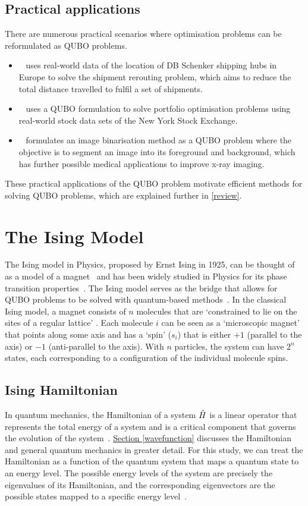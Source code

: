 \subsection{Practical applications}
There are numerous practical scenarios where optimisation problems can be reformulated as QUBO problems. 
\begin{itemize}
    \item~\cite{b7} uses real-world data of the location of DB Schenker shipping hubs in Europe to solve the shipment rerouting problem, which aims to reduce the total distance travelled to fulfil a set of shipments.
    \item~\cite{b8} uses a QUBO formulation to solve portfolio optimisation problems using real-world stock data sets of the New York Stock Exchange.
    \item~\cite{b9} formulates an image binarisation method as a QUBO problem where the objective is to segment an image into its foreground and background, which has further possible medical applications to improve x-ray imaging.
\end{itemize}
These practical applications of the QUBO problem motivate efficient methods for solving QUBO problems, which are explained further in \autoref{review}.

\section{The Ising Model}
The Ising model in Physics, proposed by Ernst Ising in 1925, can be thought of as a model of a magnet~\cite{isingising} and has been widely studied in Physics for its phase transition properties~\cite{cipra1987introduction}. The Ising model serves as the bridge that allows for QUBO problems to be solved with quantum-based methods~\cite{b10}. In the classical Ising model, a magnet consists of $n$ molecules that are `constrained to lie on the sites of a regular lattice' \cite{b11}. Each molecule $i$ can be seen as a `microscopic magnet' that points along some axis and has a `spin' ($s_i$) that is either $+1$ (parallel to the axis) or $-1$ (anti-parallel to the axis). With $n$ particles, the system can have $2^n$ states, each corresponding to a configuration of the individual molecule spins.


\subsection{Ising Hamiltonian}\label{isinghamiltonian}
In quantum mechanics, the Hamiltonian of a system $\Hat{H}$ is a linear operator that represents the total energy of a system and is a critical component that governs the evolution of the system~\cite{GriffithsSchroeter2018}. \hyperref[wavefunction]{Section \ref{wavefunction}} discusses the Hamiltonian and general quantum mechanics in greater detail. For this study, we can treat the Hamiltonian as a function of the quantum system that maps a quantum state to an energy level. The possible energy levels of the system are precisely the eigenvalues of its Hamiltonian, and the corresponding eigenvectors are the possible states mapped to a specific energy level~\cite{b21}. 

